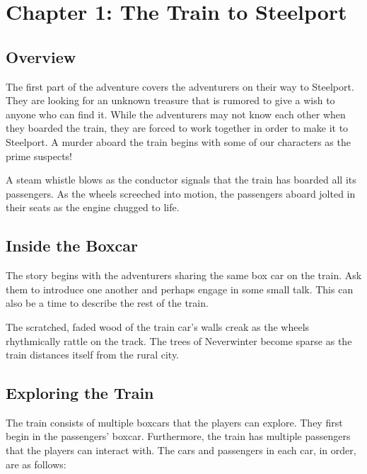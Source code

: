 \documentclass[letterpaper,10pt,twoside,twocolumn,openany]{dndbook}
\begin{document}

\chapter{Chapter 1: The Train to Steelport}

\section{Overview}

The first part of the adventure covers the adventurers on their way to Steelport.  They are looking for an unknown treasure that is rumored to give a wish to anyone who can find it.  While the adventurers may not know each other when they boarded the train, they are forced to work together in order to make it to Steelport. A murder aboard the train begins with some of our characters as the prime suspects!
 
\begin{quotebox}
A steam whistle blows as the conductor signals that the train has boarded all its passengers. As the wheels screeched into motion, the passengers aboard jolted in their seats as the engine chugged to life. 
\end{quotebox}

\section{Inside the Boxcar}
The story begins with the adventurers sharing the same box car on the train. Ask them to introduce one another and perhaps engage in some small talk.  This can also be a time to describe the rest of the train.

\begin{quotebox}
The scratched, faded wood of the train car's walls creak as the wheels rhythmically rattle on the track.  The trees of Neverwinter become sparse as the train distances itself from the rural city.
\end{quotebox}

\section{Exploring the Train}
The train consists of multiple boxcars that the players can explore.  They first begin in the passengers' boxcar.  Furthermore, the train has multiple passengers that the players can interact with. The cars and passengers in each car, in order, are as follows:
\end{document}
